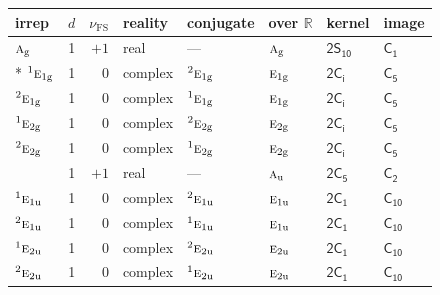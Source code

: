 \documentclass[10pt,a4paper]{article}
\numberwithin{equation}{section}
\newcommand{\grp}[1]{\mathsf{#1}}
\newcommand{\irr}[1]{\text{\normalfont\scshape #1}}
\newcommand{\conjpair}[1]{{}^{#1}}
\newcommand{\detbox}[1]{{\setlength{\fboxsep}{1pt}\fbox{#1}}}
\newcommand{\ptag}[1]{\mathrm{#1}}
\newcommand{\fsind}{\nu_{\mathrm{FS}}}
\begin{document}
{\small\renewcommand{\arraystretch}{1.25}\setlength{\tabcolsep}{4pt}\begin{longtable}{@{}lrrlllll@{}}\toprule
irrep & $d$ & $\fsind$ & reality & conjugate & over $\mathbb{R}$ & kernel & image\\\midrule\endhead
\bottomrule\endfoot\endlastfoot
$\irr{a}_{\ptag{g}}$ & 1 & $+1$ & real & --- & $\irr{a}_{\ptag{g}}$ & \href{2S10.pdf}{$\grp{2S_{10}}$} & \href{../../../rotation/data/pdf/C1.pdf}{$\grp{C_{1}}$}\\*
$\conjpair{1}\irr{e}_{1\ptag{g}}$ & 1 & $0$ & complex & $\conjpair{2}\irr{e}_{1\ptag{g}}$ & $\irr{e}_{1\ptag{g}}$ & \href{2S2.pdf}{$\grp{2C_{i}}$} & \href{../../../rotation/data/pdf/C5.pdf}{$\grp{C_{5}}$}\\
$\conjpair{2}\irr{e}_{1\ptag{g}}$ & 1 & $0$ & complex & $\conjpair{1}\irr{e}_{1\ptag{g}}$ & $\irr{e}_{1\ptag{g}}$ & \href{2S2.pdf}{$\grp{2C_{i}}$} & \href{../../../rotation/data/pdf/C5.pdf}{$\grp{C_{5}}$}\\
$\conjpair{1}\irr{e}_{2\ptag{g}}$ & 1 & $0$ & complex & $\conjpair{2}\irr{e}_{2\ptag{g}}$ & $\irr{e}_{2\ptag{g}}$ & \href{2S2.pdf}{$\grp{2C_{i}}$} & \href{../../../rotation/data/pdf/C5.pdf}{$\grp{C_{5}}$}\\
$\conjpair{2}\irr{e}_{2\ptag{g}}$ & 1 & $0$ & complex & $\conjpair{1}\irr{e}_{2\ptag{g}}$ & $\irr{e}_{2\ptag{g}}$ & \href{2S2.pdf}{$\grp{2C_{i}}$} & \href{../../../rotation/data/pdf/C5.pdf}{$\grp{C_{5}}$}\\
\detbox{$\irr{a}_{\ptag{u}}$} & 1 & $+1$ & real & --- & $\irr{a}_{\ptag{u}}$ & \href{2C5.pdf}{$\grp{2C_{5}}$} & \href{../../../rotation/data/pdf/C2.pdf}{$\grp{C_{2}}$}\\
$\conjpair{1}\irr{e}_{1\ptag{u}}$ & 1 & $0$ & complex & $\conjpair{2}\irr{e}_{1\ptag{u}}$ & $\irr{e}_{1\ptag{u}}$ & \href{2C1.pdf}{$\grp{2C_{1}}$} & \href{../../../rotation/data/pdf/C10.pdf}{$\grp{C_{10}}$}\\
$\conjpair{2}\irr{e}_{1\ptag{u}}$ & 1 & $0$ & complex & $\conjpair{1}\irr{e}_{1\ptag{u}}$ & $\irr{e}_{1\ptag{u}}$ & \href{2C1.pdf}{$\grp{2C_{1}}$} & \href{../../../rotation/data/pdf/C10.pdf}{$\grp{C_{10}}$}\\
$\conjpair{1}\irr{e}_{2\ptag{u}}$ & 1 & $0$ & complex & $\conjpair{2}\irr{e}_{2\ptag{u}}$ & $\irr{e}_{2\ptag{u}}$ & \href{2C1.pdf}{$\grp{2C_{1}}$} & \href{../../../rotation/data/pdf/C10.pdf}{$\grp{C_{10}}$}\\
$\conjpair{2}\irr{e}_{2\ptag{u}}$ & 1 & $0$ & complex & $\conjpair{1}\irr{e}_{2\ptag{u}}$ & $\irr{e}_{2\ptag{u}}$ & \href{2C1.pdf}{$\grp{2C_{1}}$} & \href{../../../rotation/data/pdf/C10.pdf}{$\grp{C_{10}}$}\\

\end{longtable}}
\end{document}
